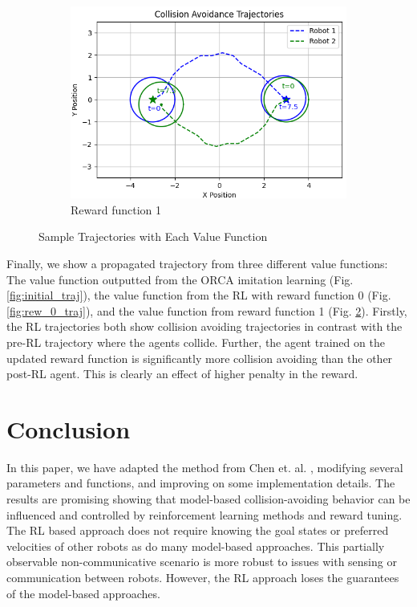 \documentclass[conference]{IEEEtran}
\begin{document}
\begin{figure}[h!]
    \begin{subfigure}[b]{0.45\textwidth}
    \centering
    \includegraphics[width=\linewidth]{docs/latex/figures/reward_1_0_.png}
    \caption{Reward function 1}
    \label{fig:rew_1_traj}
    \end{subfigure}
    \caption{Sample Trajectories with Each Value Function}
\end{figure}

Finally, we show a propagated trajectory from three different value functions: The value function outputted from the ORCA imitation learning (Fig. \ref{fig:initial_traj}), the value function from the RL with reward function 0 (Fig. \ref{fig:rew_0_traj}), and the value function from reward function 1 (Fig. \ref{fig:rew_1_traj}). Firstly, the RL trajectories both show collision avoiding trajectories in contrast with the pre-RL trajectory where the agents collide. Further, the agent trained on the updated reward function is significantly more collision avoiding than the other post-RL agent. This is clearly an effect of higher penalty in the reward. 

\section{Conclusion}
In this paper, we have adapted the method from Chen et. al. \cite{chen2017cadrl}, modifying several parameters and functions, and improving on some implementation details. The results are promising showing that model-based collision-avoiding behavior can be influenced and controlled by reinforcement learning methods and reward tuning. The RL based approach does not require knowing the goal states or preferred velocities of other robots as do many model-based approaches. This partially observable non-communicative scenario is more robust to issues with sensing or communication between robots. However, the RL approach loses the guarantees of the model-based approaches.  
\end{document}
